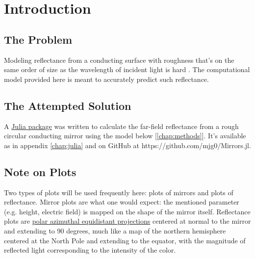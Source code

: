 \documentclass[etd,twoside,senior,noacknowledgments]{BYUPhys}
\begin{document}
\frontmatter

\makepreliminarypages

\tableofcontents

\mainmatter






\chapter{Introduction} \label{chap:intro}

\section{The Problem} \label{sec:problem}

Modeling reflectance from a conducting surface with roughness that's on the same order of size as the wavelength of incident light is hard \cite{Schroder2011}. The computational model provided here is meant to accurately predict such reflectance.



\section{The Attempted Solution} \label{sec:attempted_solution}

A \href{https://github.com/mjg0/Mirrors.jl}{Julia package} was written to calculate the far-field reflectance from a rough circular conducting mirror using the model below [\ref{chap:methods}]. It's available as in appendix \ref{chap:julia} and on GitHub at https://github.com/mjg0/Mirrors.jl.



\section{Note on Plots} \label{sec:plots_note}

Two types of plots will be used frequently here: plots of mirrors and plots of reflectance. Mirror plots are what one would expect: the mentioned parameter (e.g. height, electric field) is mapped on the shape of the mirror itself. Reflectance plots are \href{https://en.wikipedia.org/wiki/Azimuthal_equidistant_projection}{polar azimuthal equidistant projections} centered at normal to the mirror and extending to 90 degrees, much like a map of the northern hemisphere centered at the North Pole and extending to the equator, with the magnitude of reflected light corresponding to the intensity of the color.
\end{document}
